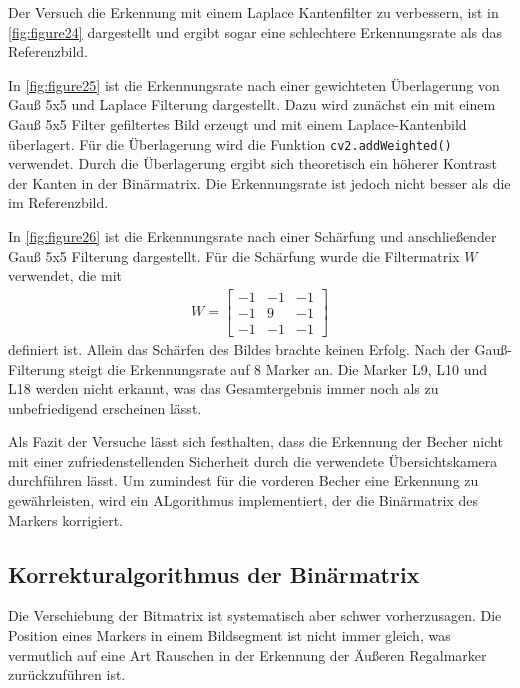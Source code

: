     Der Versuch die Erkennung mit einem Laplace Kantenfilter zu verbessern, ist in \ref{fig:figure24} dargestellt und ergibt sogar eine schlechtere Erkennungsrate als das Referenzbild.
    
    In \ref{fig:figure25} ist die Erkennungsrate nach einer gewichteten Überlagerung von Gauß 5x5 und Laplace Filterung dargestellt. 
    Dazu wird zunächst ein mit einem Gauß 5x5 Filter gefiltertes Bild erzeugt und mit einem Laplace-Kantenbild überlagert. 
    Für die Überlagerung wird die Funktion \verb|cv2.addWeighted()| verwendet. 
    Durch die Überlagerung ergibt sich theoretisch ein höherer Kontrast der Kanten in der Binärmatrix. 
    Die Erkennungsrate ist jedoch nicht besser als die im Referenzbild.

    In \ref{fig:figure26} ist die Erkennungsrate nach einer Schärfung und anschließender Gauß 5x5 Filterung dargestellt.
    Für die Schärfung wurde die Filtermatrix $W$ verwendet, die mit 
    \begin{align*}
        W = \begin{bmatrix}
            -1 & -1 & -1 \\
            -1 & 9 & -1 \\
            -1 & -1 & -1
        \end{bmatrix}
    \end{align*}
    definiert ist. Allein das Schärfen des Bildes brachte keinen Erfolg. Nach der Gauß-Filterung steigt die Erkennungsrate auf 8 Marker an. 
    Die Marker L9, L10 und L18 werden nicht erkannt, was das Gesamtergebnis immer noch als zu unbefriedigend erscheinen lässt.

    Als Fazit der Versuche lässt sich festhalten, dass die Erkennung der Becher nicht mit einer zufriedenstellenden Sicherheit durch die verwendete Übersichtskamera durchführen lässt.
    Um zumindest für die vorderen Becher eine Erkennung zu gewährleisten, wird ein ALgorithmus implementiert, der die Binärmatrix des Markers korrigiert.

    \subsection{Korrekturalgorithmus der Binärmatrix}\label{ChapKorrekturalgorithmus}

    Die Verschiebung der Bitmatrix ist systematisch aber schwer vorherzusagen. Die Position eines Markers in einem Bildsegment ist nicht immer gleich, was vermutlich auf eine Art Rauschen in der Erkennung der 
    Äußeren Regalmarker zurückzuführen ist.

